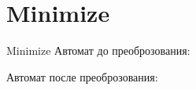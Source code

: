 \section{Minimize}
\begin{frame}{Minimize}
	Автомат до преоброзования:


	Автомат после преоброзования:

\end{frame}
